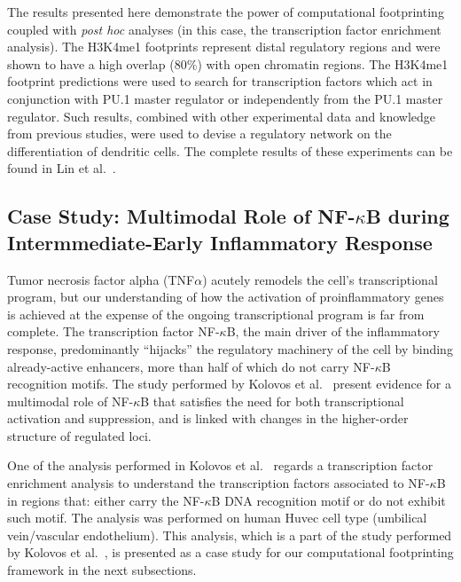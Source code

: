 The results presented here demonstrate the power of computational footprinting coupled with \emph{post hoc} analyses (in this case, the transcription factor enrichment analysis). The H3K4me1 footprints represent distal regulatory regions and were shown to have a high overlap (\approxy$80\%$) with open chromatin regions. The H3K4me1 footprint predictions were used to search for transcription factors which act in conjunction with PU.1 master regulator or independently from the PU.1 master regulator. Such results, combined with other experimental data and knowledge from previous studies, were used to devise a regulatory network on the differentiation of dendritic cells. The complete results of these experiments can be found in Lin et al.~\cite{lin2015}.

\subsection{Case Study: Multimodal Role of NF-$\kappa$B during Intermmediate-Early Inflammatory Response}
\label{sec:case.study.nfkb}

Tumor necrosis factor alpha (TNF$\alpha$) acutely remodels the cell’s transcriptional program, but our understanding of how the activation of proinflammatory genes is achieved at the expense of the ongoing transcriptional program is far from complete. The transcription factor NF-$\kappa$B, the main driver of the inflammatory response, predominantly ``hijacks'' the regulatory machinery of the cell by binding already-active enhancers, more than half of which do not carry NF-$\kappa$B recognition motifs. The study performed by Kolovos et al.~\cite{kolovos2016} present evidence for a multimodal role of NF-$\kappa$B that satisfies the need for both transcriptional activation and suppression, and is linked with changes in the higher-order structure of regulated loci.

One of the analysis performed in Kolovos et al.~\cite{kolovos2016} regards a transcription factor enrichment analysis to understand the transcription factors associated to NF-$\kappa$B in regions that: either carry the NF-$\kappa$B DNA recognition motif or do not exhibit such motif. The analysis was performed on human Huvec cell type (umbilical vein/vascular endothelium). This analysis, which is a part of the study performed by Kolovos et al.~\cite{kolovos2016}, is presented as a case study for our computational footprinting framework in the next subsections.

